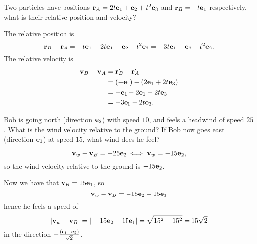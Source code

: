 \documentclass[10pt, a4paper]{article}
\begin{document}
\begin{example}
    Two particles have positions $\mathbf{r}_A = 2t\mathbf{e}_1 + \mathbf{e}_2 + t ^ 2\mathbf{e}_3$ and $\mathbf{r}_B = -t\mathbf{e}_1$ respectively,
    what is their relative position and velocity?
    
    \begin{solution}
        The relative position is
        \[
        \mathbf{r}_B - \mathbf{r}_A = -t\mathbf{e}_1 - 2t\mathbf{e}_1 - \mathbf{e}_2 - t ^ 2\mathbf{e}_3 = -3t\mathbf{e}_1 - \mathbf{e}_2 - t ^ 2\mathbf{e}_3.
        \]
        The relative velocity is
        \begin{align*}
            \mathbf{v}_B - \mathbf{v}_A &= \dot{\mathbf{r}_B} - \dot{\mathbf{r}_A} \\
            &= (-\mathbf{e}_1) - (2\mathbf{e}_1 + 2t\mathbf{e}_3) \\
            &= -\mathbf{e}_1 - 2\mathbf{e}_1 - 2t\mathbf{e}_3 \\
            &= -3\mathbf{e}_1 - 2t\mathbf{e}_3.
        \end{align*}
    \end{solution}
\end{example}

\begin{example}
    Bob is going north
    (direction $\mathbf{e}_2$)
    with speed $10$,
    and feels a headwind of speed $25$.
    What is the wind velocity relative to the ground?
    If Bob now goes east
    (direction $\mathbf{e}_1$)
    at speed $15$,
    what wind does he feel?

    \begin{solution}
        \[
        \mathbf{v}_w - \mathbf{v}_B = -25\mathbf{e}_2 \iff \mathbf{v}_w = -15\mathbf{e}_2,
        \]
        so the wind velocity relative to the ground is $-15\mathbf{e}_2$.

        Now we have that $\mathbf{v}_B = 15\mathbf{e}_1$,
        so
        \[
        \mathbf{v}_w - \mathbf{v}_B = -15\mathbf{e}_2 - 15\mathbf{e}_1
        \]
        hence he feels a speed of
        \[
        |\mathbf{v}_w - \mathbf{v}_B| = |-15\mathbf{e}_2 - 15\mathbf{e}_1| = \sqrt{15 ^ 2 + 15 ^ 2} = 15\sqrt{2}
        \]
        in the direction $-\frac{(\mathbf{e}_1 + \mathbf{e}_2)}{\sqrt{2}}$.
    \end{solution}
\end{example}
\end{document}
